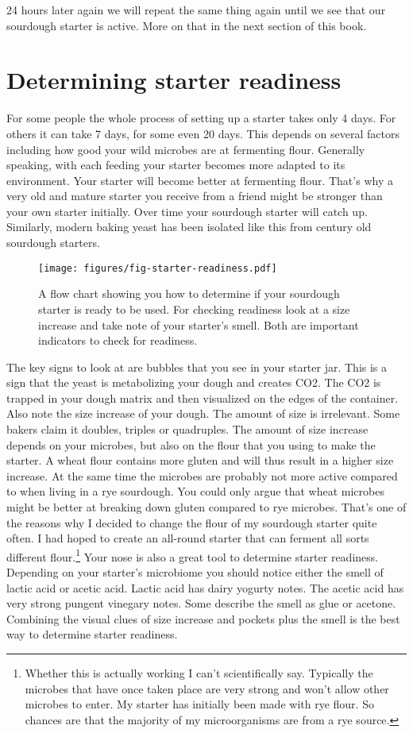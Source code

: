 24 hours later again we will repeat the same thing again until
we see that our sourdough starter is active. More on that in the
next section of this book.

\section{Determining starter readiness}

For some people the whole process of setting up a starter takes
only 4 days. For others it can take 7 days, for some even 20 days.
This depends on several factors including how good your wild microbes
are at fermenting flour. Generally speaking, with each feeding
your starter becomes more adapted to its environment. Your
starter will become better at fermenting flour. That's why
a very old and mature starter you receive from a friend might
be stronger than your own starter initially. Over time
your sourdough starter will catch up. Similarly, modern baking
yeast has been isolated like this from century old sourdough
starters.

\begin{figure}[!htb]
  \texttt{[image: figures/fig-starter-readiness.pdf]}
  \caption{A flow chart showing you how to determine if your sourdough starter is ready to be used.
  For checking readiness look at a size increase and take note of your starter's smell. Both are important
  indicators to check for readiness.}
  \label{fig:sourdough-starter-readiness}
\end{figure}

The key signs to look at are bubbles that you see in your starter
jar. This is a sign that the yeast is metabolizing your
dough and creates CO2. The CO2 is trapped in your dough
matrix and then visualized on the edges of the container.
Also note the size increase of your dough. The amount of size
is irrelevant. Some bakers claim it doubles, triples or quadruples.
The amount of size increase depends on your microbes, but also on
the flour that you using to make the starter. A wheat flour contains
more gluten and will thus result in a higher size increase. At
the same time the microbes are probably not more active compared
to when living in a rye sourdough. You could only argue that
wheat microbes might be better at breaking down gluten compared
to rye microbes. That's one of the reasons why I decided to change
the flour of my sourdough starter quite often. I had hoped to create
an all-round starter that can ferment all sorts different flour.\footnote
{Whether this is actually working I can't scientifically say.
Typically the microbes that have once taken place are very strong
and won't allow other microbes to enter. My starter has initially
been made with rye flour. So chances are that the majority of
my microorganisms are from a rye source.} Your nose is also
a great tool to determine starter readiness. Depending on
your starter's microbiome you should notice either the smell
of lactic acid or acetic acid. Lactic acid has dairy yogurty notes.
The acetic acid has very strong pungent vinegary notes. Some
describe the smell as glue or acetone. Combining the visual clues
of size increase and pockets plus the smell is the best way
to determine starter readiness.

